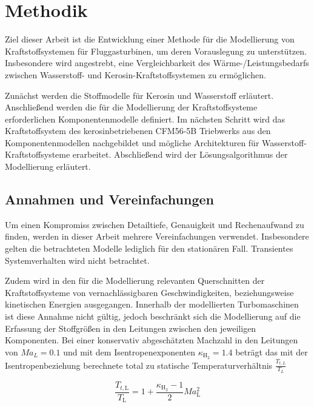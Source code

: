 \chapter{Methodik}
\label{chap:methodik}
Ziel dieser Arbeit ist die Entwicklung einer Methode für die Modellierung von Kraftstoffsystemen für Fluggasturbinen, um deren Vorauslegung zu unterstützen. Insbesondere wird angestrebt, eine Vergleichbarkeit des Wärme-/Leistungsbedarfs zwischen Wasserstoff- und Kerosin-Kraftstoffsystemen zu ermöglichen. 

Zunächst werden die Stoffmodelle für Kerosin und Wasserstoff erläutert. Anschließend werden die für die Modellierung der Kraftstoffsysteme erforderlichen Komponentenmodelle definiert. Im nächsten Schritt wird das Kraftstoffsystem des kerosinbetriebenen CFM56-5B Triebwerks aus den Komponentenmodellen nachgebildet und mögliche Architekturen für Wasserstoff-Kraftstoffsysteme erarbeitet. Abschließend wird der Lösungsalgorithmus der Modellierung erläutert.

\section{Annahmen und Vereinfachungen}

Um einen Kompromiss zwischen Detailtiefe, Genauigkeit und Rechenaufwand zu finden, werden in dieser Arbeit mehrere Vereinfachungen verwendet. Insbesondere gelten die betrachteten Modelle lediglich für den stationären Fall. Transientes Systemverhalten wird nicht betrachtet. 

Zudem wird in den für die Modellierung relevanten Querschnitten der Kraftstoffsysteme von vernachlässigbaren Geschwindigkeiten, beziehungsweise kinetischen Energien ausgegangen. Innerhalb der modellierten Turbomaschinen ist diese Annahme nicht gültig, jedoch beschränkt sich die Modellierung auf die Erfassung der Stoffgrößen in den Leitungen zwischen den jeweiligen Komponenten. Bei einer konservativ abgeschätzten Machzahl in den Leitungen von $Ma_L=0.1$ und mit dem Isentropenexponenten $\kappa_{\mathrm{H}_2} = 1.4$ beträgt das mit der Isentropenbeziehung berechnete total zu statische Temperaturverhältnis  $\frac{T_{t,L}}{T_L}$

\begin{equation}\label{Eq:mach}
	\frac{T_{t,\mathrm{L}}}{T_\mathrm{L}}=1+\frac{\kappa_{\mathrm{H}_2}-1}{2}Ma_\mathrm{L}^2
\end{equation}

